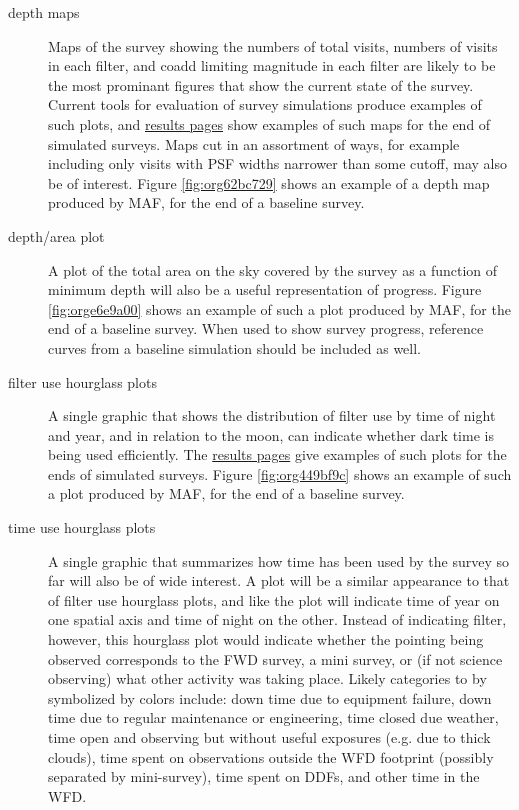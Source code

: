\begin{description}
\item[{depth maps}] Maps of the survey showing the numbers of total visits, numbers of visits in each filter, and coadd limiting magnitude in each filter are likely to be the most prominant figures that show the current state of the survey. Current tools for evaluation of survey simulations produce examples of such plots, and \href{http://astro-lsst-01.astro.washington.edu:8081/allMetricResults?runId=392\#Basic\%20Maps}{results pages} show examples of such maps for the end of simulated surveys. Maps cut in an assortment of ways, for example including only visits with PSF widths narrower than some cutoff, may also be of interest. Figure \ref{fig:org62bc729} shows an example of a depth map produced by MAF, for the end of a baseline survey.
\item[{depth/area plot}] A plot of the total area on the sky covered by the survey as a function of minimum depth will also be a useful representation of progress. Figure \ref{fig:orge6e9a00} shows an example of such a plot produced by MAF, for the end of a baseline survey. When used to show survey progress, reference curves from a baseline simulation should be included as well.
\item[{filter use hourglass plots}] A single graphic that shows the distribution of filter use by time of night and year, and in relation to the moon, can indicate whether dark time is being used efficiently. The \href{http://astro-lsst-01.astro.washington.edu:8081/allMetricResults?runId=392\#Hourglass}{results pages} give examples of such plots for the ends of simulated surveys. Figure \ref{fig:org449bf9c} shows an example of such a plot produced by MAF, for the end of a baseline survey.
\item[{time use hourglass plots}] A single graphic that summarizes how time has been used by the survey so far will also be of wide interest. A plot will be a similar appearance to that of filter use hourglass plots, and like the plot will indicate time of year on one spatial axis and time of night on the other. Instead of indicating filter, however, this hourglass plot would indicate whether the pointing being observed corresponds to the FWD survey, a mini survey, or (if not science observing) what other activity was taking place. Likely categories to by symbolized by colors include: down time due to equipment failure, down time due to regular maintenance or engineering, time closed due weather, time open and observing but without useful exposures (e.g. due to thick clouds), time spent on observations outside the WFD footprint (possibly separated by mini-survey), time spent on DDFs, and other time in the WFD.

\end{description}
